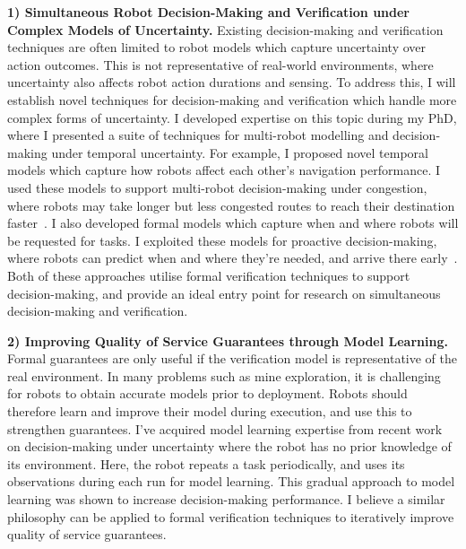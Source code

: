 \documentclass[12pt]{article}
\begin{document}
\vspace*{1ex}\noindent\textbf{1) Simultaneous Robot Decision-Making and Verification under Complex Models of Uncertainty.} 
%
Existing decision-making and verification techniques are often limited to robot models which capture uncertainty over action outcomes.
%
This is not representative of real-world environments, where uncertainty also affects robot action durations and sensing.
%
To address this, I will establish novel techniques for decision-making and verification which handle more complex forms of uncertainty.
%
I developed expertise on this topic during my PhD, where I presented a suite of techniques for multi-robot modelling and decision-making under temporal uncertainty.
%
For example, I proposed novel temporal models which capture how robots affect each other's navigation performance.
%
I used these models to support multi-robot decision-making under congestion, where robots may take longer but less congested routes to reach their destination faster~\cite{street2020multi,street2021congestion}.
%
I also developed formal models which capture when and where robots will be requested for tasks.
%
I exploited these models for proactive decision-making, where robots can predict when and where they're needed, and arrive there early~\cite{street2024right}.
%
Both of these approaches utilise formal verification techniques to support decision-making, and provide an ideal entry point for research on simultaneous decision-making and verification.

\vspace*{1ex}\noindent\textbf{2) Improving Quality of Service Guarantees through Model Learning.}
%
Formal guarantees are only useful if the verification model is representative of the real environment.
%
In many problems such as mine exploration, it is challenging for robots to obtain accurate models prior to deployment.
%
Robots should therefore learn and improve their model during execution, and use this to strengthen guarantees.
%
I've acquired model learning expertise from recent work on decision-making under uncertainty where the robot has no prior knowledge of its environment.
%
Here, the robot repeats a task periodically, and uses its observations during each run for model learning.
%
This gradual approach to model learning was shown to increase decision-making performance.
%
I believe a similar philosophy can be applied to formal verification techniques to iteratively improve quality of service guarantees.
\end{document}
